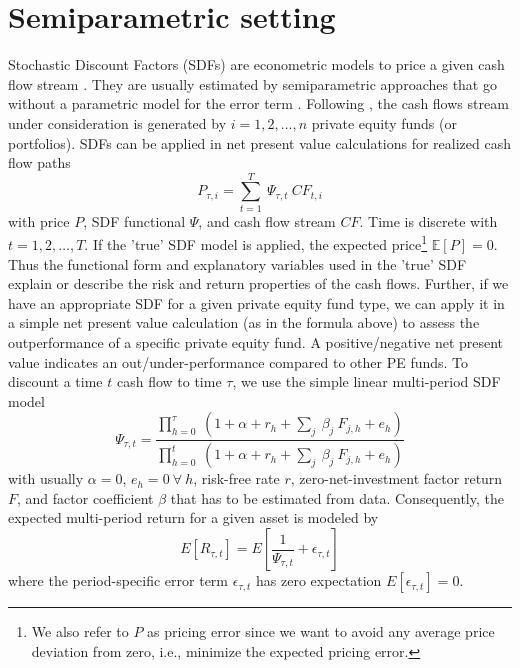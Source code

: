 \documentclass[12pt]{article}
\begin{document}
\section{Semiparametric setting}
\label{sec:semiparametric_setting}

Stochastic Discount Factors (SDFs) are econometric models to price a given cash flow stream \citep{HR87}.
They are usually estimated by semiparametric approaches that go without a parametric model for the error term \citep{F19}.
Following \cite{DLP12}, the cash flows stream under consideration is generated by $i=1,2,\dots,n$ private equity funds (or portfolios).
SDFs can be applied in net present value calculations for realized cash flow paths
\begin{equation}
\label{eq:pricing_error}
P_{\tau, i} =
\sum_{t=1}^{T}\ \Psi_{\tau, t}\ {CF}_{t, i}
\end{equation}
with price $P$, SDF functional $\Psi$, and cash flow stream $CF$. 
Time is discrete with $t=1,2,\dots,T$.
If the 'true' SDF model is applied, the expected price\footnote{We also refer to $P$ as pricing error since we want to avoid any average price deviation from zero, i.e., minimize the expected pricing error.} $\mathbb{E}[P]=0$. 
Thus the functional form and explanatory variables used in the 'true' SDF explain or describe the risk and return properties of the cash flows. 
Further, if we have an appropriate SDF for a given private equity fund type, we can apply it in a simple net present value calculation (as in the formula above) to assess the outperformance of a specific private equity fund. 
A positive/negative net present value indicates an out/under-performance compared to other PE funds.
To discount a time $t$ cash flow to time $\tau$, we use the simple linear multi-period SDF model
\begin{equation}
\label{eq:linear_sdf}
\Psi_{\tau,t} =
\frac{
	\prod_{h=0}^{\tau}\ \left(1 + \alpha + r_{h} + \sum_j\ \beta_j\ F_{j,h} + e_h \right)
}{
	\prod_{h=0}^{t}\ \left(1+ \alpha + r_{h} + \sum_j\ \beta_j\ F_{j,h} + e_h \right)
}
\end{equation}
with usually $\alpha=0$, $e_h=0 \ \forall \ h$, risk-free rate $r$, zero-net-investment factor return $F$, and factor coefficient $\beta$ that has to be estimated from data. 
Consequently, the expected multi-period return for a given asset is modeled by
\[
E \left[R_{\tau,t} \right] = 
E \left[ \frac{1}{\Psi_{\tau,t}} + \epsilon_{\tau,t} \right]
\]
where the period-specific error term $\epsilon_{\tau,t}$ has zero expectation $E[\epsilon_{\tau,t}]=0$.
\end{document}

